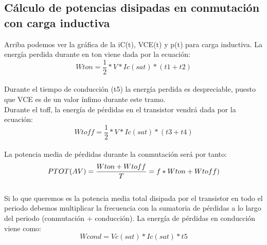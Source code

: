 \documentclass[12pt,a4paper]{article}
\begin{document}
\subsection{Cálculo de potencias disipadas en conmutación con carga inductiva}
Arriba podemos ver la gráfica de la i{\tiny C}(t), V{\tiny CE}(t) y p(t) para carga inductiva. La energía perdida durante en ton viene dada por la ecuación:\\
$$Wton=\dfrac{1}{2}*V*Ic(sat)*(t1+t2)$$\\
Durante el tiempo de conducción (t5) la energía perdida es despreciable, puesto que VCE es de un valor ínfimo durante este tramo.\\
Durante el toff, la energía de pérdidas en el transistor vendrá dada por la ecuación:\\
$$Wtoff = \dfrac{1}{2}*V*Ic(sat)*(t3+t4)$$\\
La potencia media de pérdidas durante la conmutación será por tanto:\\
$$P{\scriptsize TOT(AV)}= \dfrac{Wton+Wtoff}{T}=f*Wton+Wtoff) $$\\
Si lo que queremos es la potencia media total disipada por el transistor en todo el periodo debemos multiplicar la frecuencia con la sumatoria de pérdidas a lo largo del periodo (conmutación + conducción). La energía de pérdidas en conducción viene como:\\
$$Wcond=Vc(sat)*Ic(sat)*t5$$
\end{document}
